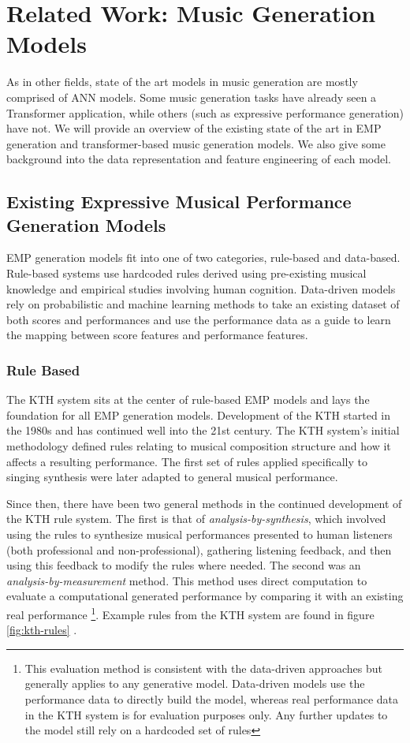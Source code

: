 \chapter{Related Work: Music Generation Models}\label{ch:ch4}
As in other fields, state of the art models in music generation are mostly comprised of ANN models. Some music generation tasks have already seen a Transformer application, while others (such as expressive performance generation) have not. We will provide an overview of the existing state of the art in EMP generation and transformer-based music generation models. We also give some background into the data representation and feature engineering of each model. 

\section{Existing Expressive Musical Performance Generation Models}
EMP generation models fit into one of two categories, rule-based and data-based. Rule-based systems use hardcoded rules derived using pre-existing musical knowledge and empirical studies involving human cognition. Data-driven models rely on probabilistic and machine learning methods to take an existing dataset of both scores and performances and use the performance data as a guide to learn the mapping between score features and performance features. 

\subsection{Rule Based}
The KTH system \cite{friberg2006overview} sits at the center of rule-based EMP models and lays the foundation for all EMP generation models. Development of the KTH started in the 1980s and has continued well into the 21st century. The KTH system's initial methodology defined rules relating to musical composition structure and how it affects a resulting performance. The first set of rules applied specifically to singing synthesis were later adapted to general musical performance. 

Since then, there have been two general methods in the continued development of the KTH rule system. The first is that of \emph{analysis-by-synthesis}, which involved using the rules to synthesize musical performances presented to human listeners (both professional and non-professional), gathering listening feedback, and then using this feedback to modify the rules where needed. The second was an \emph{analysis-by-measurement} method. This method uses direct computation to evaluate a computational generated performance by comparing it with an existing real performance \footnote{This evaluation method is consistent with the data-driven approaches but generally applies to any generative model. Data-driven models use the performance data to directly build the model, whereas real performance data in the KTH system is for evaluation purposes only. Any further updates to the model still rely on a hardcoded set of rules}. Example rules from the KTH system are found in figure \ref{fig:kth-rules} . 

